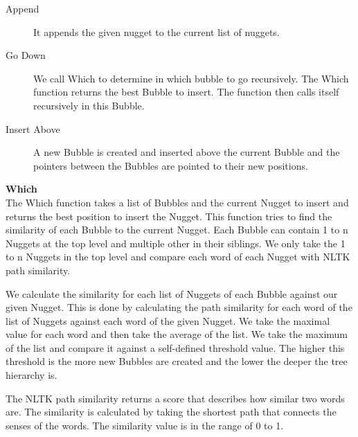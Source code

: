 \begin{description}
\item [Append] It appends the given nugget to the current list of nuggets.
\item [Go Down] We call Which to determine in which bubble to go recursively. The Which function returns the best Bubble to insert. The function then calls itself recursively in this Bubble.
\item [Insert Above] A new Bubble is created and inserted above the current Bubble and the pointers between the Bubbles are pointed to their new positions.
\end{description}

\textbf{Which}\\

The Which function takes a list of Bubbles and the current Nugget to insert and returns the best position to insert the Nugget. This function tries to find the similarity of each Bubble to the current Nugget. Each Bubble can contain 1 to n Nuggets at the top level and multiple other in their siblings. We only take the 1 to n Nuggets in the top level and compare each word of each Nugget with NLTK path similarity.


We calculate the similarity for each list of Nuggets of each Bubble against our given Nugget. This is done by calculating the path similarity for each word of the list of Nuggets against each word of the given Nugget. We take the maximal value for each word and then take the average of the list. We take the maximum of the list and compare it against a self-defined threshold value. The higher this threshold is the more new Bubbles are created and the lower the deeper the tree hierarchy is.

The NLTK path similarity returns a score that describes how similar two words are. The similarity is calculated by taking the shortest path that connects the senses of the words. The similarity value is in the range of 0 to 1.

